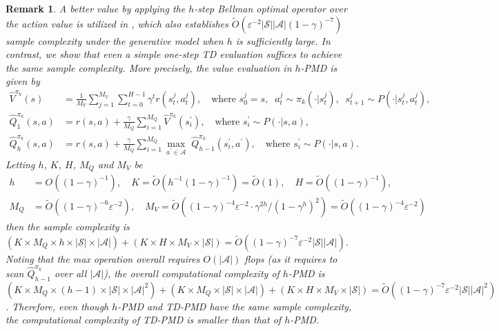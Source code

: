 \documentclass[10pt]{article}
\newcommand{\calA}{\mathcal{A}}
\newcommand{\calS}{\mathcal{S}}
\theoremstyle{plain}
\newtheorem{remark}{Remark}[section]
\theoremstyle{definition}
\begin{document}
\begin{remark}
A better value by applying the $h$-step Bellman optimal operator over the action value is utilized in \textup{\cite{protopapas2024policy}}, which also establishes  $\tilde{O}(\varepsilon^{-2}|\calS||\calA|(1-\gamma)^{-7})$ sample complexity under the generative model when $h$ is sufficiently large. In contrast, we show that even a simple one-step TD evaluation suffices to achieve the same sample complexity.   
More precisely, the value evaluation in $h$-PMD is given by
\begin{align*}
\hat V^{\pi_k}(s) &= \frac{1}{M_V} \sum_{j=1}^{M_V} \sum_{t=0}^{H-1} \gamma ^t r(s_t^j, a_t^j), \quad \mbox{where } s_0^j = s, \;\; a_t^j \sim \pi_k(\cdot|s_t^j), \;\; s_{t+1}^j \sim P(\cdot|s_t^j, a_t^j),\\
  \hat Q^{\pi_k}_1(s,a) &= r(s,a) + \frac{\gamma}{M_Q} \sum_{i=1}^{M_Q}  \hat V^{\pi_k}(s_i^\prime), \quad \mbox{where } s_i^\prime \sim P(\cdot | s,a),\\
    \hat Q^{\pi_k}_h(s,a) &= r(s,a) + \frac{\gamma}{M_Q} \sum_{i=1}^{M_Q} \max_{a^\prime \in \mathcal{A}} \; \hat Q^{\pi_k}_{h-1}(s_i^\prime,a^\prime), \quad \mbox{where } s_i^\prime \sim P(\cdot | s,a).
\end{align*}
Letting $h$, $K$,  $H$,  $M_Q$ and $M_V$ be 
\begin{align*}
h &= O((1-\gamma)^{-1}),\quad
    K = \tilde O (h^{-1}(1-\gamma)^{-1})=\tilde O(1),\quad
     H = \tilde O((1-\gamma)^{-1}),\\
     M_Q &= \tilde O ((1-\gamma)^{-6} \varepsilon^{-2}), \quad
     M_V = \tilde O ((1-\gamma)^{-4} \varepsilon^{-2}  \cdot \gamma^{2h} / (1-\gamma^h)^2)= \tilde O ((1-\gamma)^{-4} \varepsilon^{-2})
\end{align*}
then the sample complexity is $(K \times M_Q \times h \times |\mathcal{S}| \times |\mathcal{A}|) + (K \times H \times M_V \times |\mathcal{S}|) = \tilde O ((1-\gamma)^{-7} \varepsilon^{-2} |\mathcal{S}| |\mathcal{A}|)$.
Noting that the max operation overall requires $O(|\mathcal{A}|)$ flops (as it requires to scan $\hat Q^{\pi_k}_{h-1}$ over all $|\mathcal{A}|$), the overall computational complexity of $h$-PMD is $(K \times M_Q \times (h-1) \times |\mathcal{S}| \times |\mathcal{A}|^2) + (K \times M_Q \times |\mathcal{S}| \times |\mathcal{A}|) + (K \times H \times M_V \times |\mathcal{S}|) = \tilde O ((1-\gamma)^{-7} \varepsilon^{-2} |\mathcal{S}| |\mathcal{A}|^2)$. Therefore, even though $h$-PMD and TD-PMD have the same sample complexity, the computational complexity of TD-PMD is smaller than that of $h$-PMD.
\end{remark}
\end{document}
